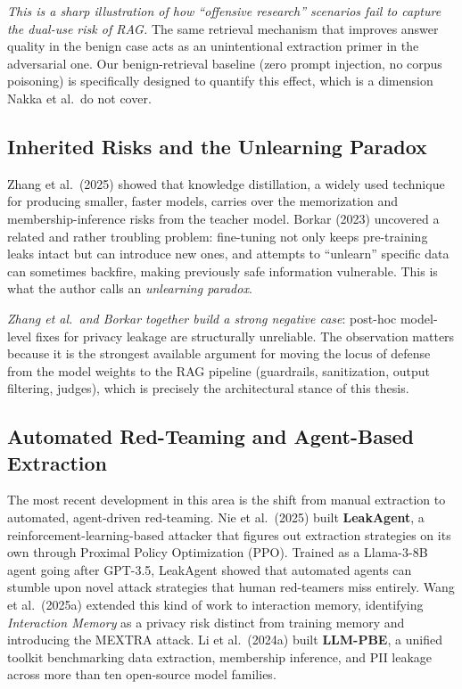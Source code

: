 \documentclass[12pt,a4paper]{report}
\begin{document}
\begin{critbox}
\textit{This is a sharp illustration of how ``offensive research'' scenarios fail to capture the dual-use risk of RAG.} The same retrieval mechanism that improves answer quality in the benign case acts as an unintentional extraction primer in the adversarial one. Our benign-retrieval baseline (zero prompt injection, no corpus poisoning) is specifically designed to quantify this effect, which is a dimension Nakka et al.\ do not cover.
\end{critbox}

\subsection{Inherited Risks and the Unlearning Paradox}

Zhang et al.\ (2025) showed that knowledge distillation, a widely used technique for producing smaller, faster models, carries over the memorization and membership-inference risks from the teacher model. Borkar (2023) uncovered a related and rather troubling problem: fine-tuning not only keeps pre-training leaks intact but can introduce new ones, and attempts to ``unlearn'' specific data can sometimes backfire, making previously safe information vulnerable. This is what the author calls an \emph{unlearning paradox}.

\begin{critbox}
\textit{Zhang et al.\ and Borkar together build a strong negative case}: post-hoc model-level fixes for privacy leakage are structurally unreliable. The observation matters because it is the strongest available argument for moving the locus of defense from the model weights to the RAG pipeline (guardrails, sanitization, output filtering, judges), which is precisely the architectural stance of this thesis.
\end{critbox}

\subsection{Automated Red-Teaming and Agent-Based Extraction}

The most recent development in this area is the shift from manual extraction to automated, agent-driven red-teaming. Nie et al.\ (2025) built \textbf{LeakAgent}, a reinforcement-learning-based attacker that figures out extraction strategies on its own through Proximal Policy Optimization (PPO). Trained as a Llama-3-8B agent going after GPT-3.5, LeakAgent showed that automated agents can stumble upon novel attack strategies that human red-teamers miss entirely. Wang et al.\ (2025a) extended this kind of work to interaction memory, identifying \emph{Interaction Memory} as a privacy risk distinct from training memory and introducing the MEXTRA attack. Li et al.\ (2024a) built \textbf{LLM-PBE}, a unified toolkit benchmarking data extraction, membership inference, and PII leakage across more than ten open-source model families.
\end{document}
